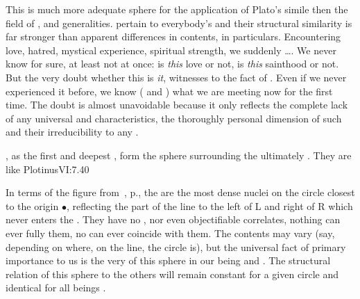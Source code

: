 This is much more adequate sphere for the application of Plato's
 simile then the field of ,  and generalities.
  pertain to everybody's  and
their structural similarity is far stronger than apparent differences
in contents, in  particulars.  Encountering
love, hatred, mystical experience, spiritual strength, we suddenly
\ldots {}.  We never know for sure, at least not at once: is {\em
this} love or 
not, is {\em this} sainthood or not. But the very doubt whether this
is {\em it},
witnesses to the fact of .  Even if we never
experienced it before, we know ( and )
what we are meeting now for the first time.  The doubt is almost
unavoidable because it only reflects the complete lack of any
universal and  characteristics, the thoroughly personal
dimension of such  and their irreducibility to any .

\pa %
, as the first and deepest , form the sphere
surrounding the ultimately . They are like \citet{the
  intellection that remains within its place of origin; it has that source as
  substratum but becomes a sort of addition to it in that it is an activity of
  that source perfecting the potentiality there, not by producing anything but
  as being a completing power to the principle in which it
  inheres.}{Plotinus}{VI:7.40}

In terms of the figure from~, p.\pageref{fig:levels}, the
 are the most dense nuclei on the circle closest to the origin
$\bullet$, reflecting the part of the line to the left of L and right of R which
never enters the . They have no , nor even
{objectifiable} correlates, nothing  can ever fully 
them, no  can ever coincide with them.  The 
contents may vary (say, depending on where, on the line, the circle is), but the
universal fact of primary importance to us is the very  of this
sphere in our being and . The structural relation of this sphere
to the others will remain constant for a given circle and identical for all
beings .

